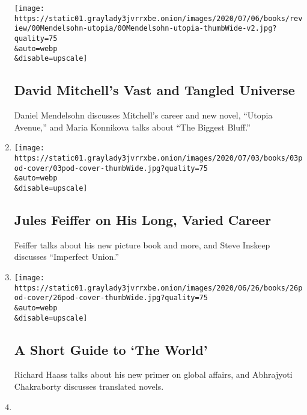 \begin{enumerate}
  \texttt{[image: https://static01.graylady3jvrrxbe.onion/images/2020/07/06/books/review/00Mendelsohn-utopia/00Mendelsohn-utopia-thumbWide-v2.jpg?quality=75\\\&auto=webp\\\&disable=upscale]}

  \hypertarget{david-mitchells-vast-and-tangled-universe}{%
  \subsection{David Mitchell's Vast and Tangled
  Universe}\label{david-mitchells-vast-and-tangled-universe}}

  Daniel Mendelsohn discusses Mitchell's career and new novel, ``Utopia
  Avenue,'' and Maria Konnikova talks about ``The Biggest Bluff.''
\item
  \href{/2020/07/03/books/review/podcast-jules-feiffer-smart-george-steve-inskeep-imperfect-union.html}{}

  \texttt{[image: https://static01.graylady3jvrrxbe.onion/images/2020/07/03/books/03pod-cover/03pod-cover-thumbWide.jpg?quality=75\\\&auto=webp\\\&disable=upscale]}

  \hypertarget{jules-feiffer-on-his-long-varied-career}{%
  \subsection{Jules Feiffer on His Long, Varied
  Career}\label{jules-feiffer-on-his-long-varied-career}}

  Feiffer talks about his new picture book and more, and Steve Inskeep
  discusses ``Imperfect Union.''
\item
  \href{/2020/06/26/books/review/podcast-richard-haass-world-brief-introduction.html}{}

  \texttt{[image: https://static01.graylady3jvrrxbe.onion/images/2020/06/26/books/26pod-cover/26pod-cover-thumbWide.jpg?quality=75\\\&auto=webp\\\&disable=upscale]}

  \hypertarget{a-short-guide-to-the-world}{%
  \subsection{A Short Guide to `The
  World'}\label{a-short-guide-to-the-world}}

  Richard Haass talks about his new primer on global affairs, and
  Abhrajyoti Chakraborty discusses translated novels.
\item
  \href{/2020/06/18/books/review/andre-leon-talley-chiffon-trenches-claudia-rankine-jericho-brown-megha-majumdar-burning.html}{}


\end{enumerate}
